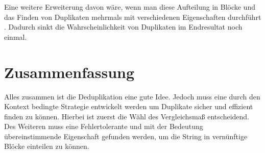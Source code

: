\documentclass[sigconf]{acmart}
\begin{document}
Eine weitere Erweiterung davon wäre, wenn man diese
Aufteilung in Blöcke und das Finden von Duplikaten
mehrmals mit verschiedenen Eigenschaften durchführt
\cite[Vlg. S. 11]{elmagarmid1}.
Dadurch sinkt die Wahrscheinlichkeit von Duplikaten
im Endresultat noch einmal.

\section*{Zusammenfassung}
Alles zusammen ist die Deduplikation eine gute Idee.
Jedoch muss eine durch den Kontext bedingte Strategie entwickelt
werden um Duplikate sicher und effizient finden zu
können. Hierbei ist zuerst die Wähl des Vergleichsmaß
entscheidend. Des Weiteren muss eine Fehlertolerante
und mit der Bedeutung übereinstimmende Eigenschaft
gefunden werden, um die String in vernünftige Blöcke
einteilen zu können.



\end{document}
